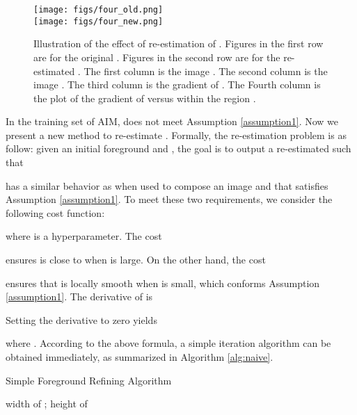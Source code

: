 \documentclass{article}
\theoremstyle{plain}
\begin{document}
\begin{figure*}[t]
  \centering
  \texttt{[image: figs/four\_old.png]}
  \\
  \texttt{[image: figs/four\_new.png]}
  \caption{Illustration of the effect of re-estimation of . 
      Figures in the first row are for the original .
      Figures in the second row are for the re-estimated .
      The first column is the image .
      The second column is the image .
      The third column is the gradient of .
      The Fourth column is the plot of the gradient of  versus  within the region .
  }
  \label{fig:four_and_four}
\end{figure*}













In the training set of AIM,  does not meet Assumption \ref{assumption1}.
Now we present a new method to re-estimate .
Formally, the re-estimation problem is as follow:
given an initial foreground  and , the goal is to output a re-estimated  such that 

has a similar behavior as
 when used to compose an image
and
that 
 satisfies Assumption \ref{assumption1}. 
To meet these two requirements, we consider the following cost function:
{\small
    
}where  is a hyperparameter.
The cost

ensures  is close to  when  is large.
On the other hand, the cost

ensures that  is locally smooth when  is small, which conforms Assumption \ref{assumption1}. 
The derivative of  is
{\small

}Setting
the derivative  to zero yields
{\small

}where .
According to the above formula, 
a simple iteration algorithm can be obtained immediately, as summarized in Algorithm \ref{alg:naive}.
\begin{algorithm}
\DontPrintSemicolon
    \SetAlgoNoLine
    \caption{Simple Foreground Refining Algorithm}
    \label{alg:naive}
    \Fn{\Fun{, , , } } {
         width of 
        ;
         height of 
        \;
        
        \;
        \For{ \KwTo }{
        \For{ \KwTo }{
        \For{ \KwTo }{
    
            \;
        }
    }
}
        \Return \;
    }
\end{algorithm}
\end{document}
